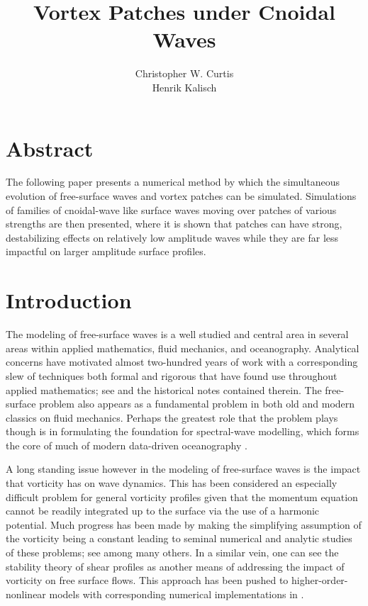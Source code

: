 \documentclass[a4paper,11pt]{article}
\title{Vortex Patches under Cnoidal Waves}
\author{Christopher W. Curtis\\
Henrik Kalisch}
\date{}
\begin{document}
\maketitle
\section*{Abstract}
The following paper presents a numerical method by which the simultaneous evolution of free-surface waves and vortex patches can be simulated.  Simulations of families of cnoidal-wave like surface waves moving over patches of various strengths are then presented, where it is shown that patches can have strong, destabilizing effects on relatively low amplitude waves while they are far less impactful on larger amplitude surface profiles.  
\section{Introduction}
The modeling of free-surface waves is a well studied and central area in several areas within applied mathematics, fluid mechanics, and oceanography.  Analytical concerns have motivated almost two-hundred years of work with a corresponding slew of techniques both formal and rigorous that have found use throughout applied mathematics; see \cite{constantin} and the historical notes contained therein.  The free-surface problem also appears as a fundamental problem in both old \cite{lamb} and modern \cite{kundu} classics on fluid mechanics. Perhaps the greatest role that the problem plays though is in formulating the foundation for spectral-wave modelling, which forms the core of much of modern data-driven oceanography \cite{holthuijsen}.

A long standing issue however in the modeling of free-surface waves is the impact that vorticity has on wave dynamics.  This has been considered an especially difficult problem for general vorticity profiles given that the momentum equation cannot be readily integrated up to the surface via the use of a harmonic potential.  Much progress has been made by making the simplifying assumption of the vorticity being a constant leading to seminal numerical and analytic studies of these problems; see \cite{constantin,pullin1,simmen,dasilva} among many others.  In a similar vein, one can see the stability theory of shear profiles \cite{craik2,craik3,drazen,phillips1} as another means of addressing the impact of vorticity on free surface flows.  This approach has been pushed to higher-order-nonlinear models with corresponding numerical implementations in \cite{nwogu2}.
\end{document}
